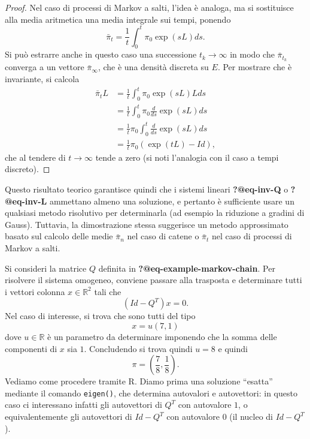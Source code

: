 \documentclass[
  italian,
  letterpaper,
]{book}
\newenvironment{Shaded}{\begin{snugshade}}{\end{snugshade}}
\newcommand{\AttributeTok}[1]{\textcolor[rgb]{0.40,0.45,0.13}{#1}}
\newcommand{\CommentTok}[1]{\textcolor[rgb]{0.37,0.37,0.37}{#1}}
\newcommand{\ConstantTok}[1]{\textcolor[rgb]{0.56,0.35,0.01}{#1}}
\newcommand{\DecValTok}[1]{\textcolor[rgb]{0.68,0.00,0.00}{#1}}
\newcommand{\FloatTok}[1]{\textcolor[rgb]{0.68,0.00,0.00}{#1}}
\newcommand{\FunctionTok}[1]{\textcolor[rgb]{0.28,0.35,0.67}{#1}}
\newcommand{\NormalTok}[1]{\textcolor[rgb]{0.00,0.23,0.31}{#1}}
\newcommand{\OtherTok}[1]{\textcolor[rgb]{0.00,0.23,0.31}{#1}}
\newcommand{\SpecialCharTok}[1]{\textcolor[rgb]{0.37,0.37,0.37}{#1}}
\newcommand{\bra}[1]{\left( #1 \right)}
\newcommand{\R}{\mathbb{R}}
\theoremstyle{definition}
\theoremstyle{remark}
\begin{document}
\begin{proof}
Nel caso di processi di Markov a salti, l'idea è analoga, ma si
sostituisce alla media aritmetica una media integrale sui tempi, ponendo
\[ \bar{\pi}_t = \frac 1 t \int_0^t \pi_0 \exp\bra{ s L} d s. \] Si può
estrarre anche in questo caso una successione \(t_k\to \infty\) in modo
che \(\bar{\pi}_{t_k}\) converga a un vettore \(\bar{\pi}_\infty\), che
è una densità discreta su \(E\). Per mostrare che è invariante, si
calcola
\[ \begin{split} \bar{\pi}_t L & = \frac 1 t \int_0^t \pi_0 \exp\bra{ s L} L  d s\\
& = \frac 1 t \int_0^t \pi_0 \frac{d}{ds} \exp\bra{ s L}   d s \\
& =  \frac 1 t  \pi_0 \int_0^t \frac{d}{ds} \exp\bra{ s L}   d s\\
& = \frac 1 t \pi_0 \bra{ \exp\bra{t L} - Id},\end{split}\] che al
tendere di \(t \to \infty\) tende a zero (si noti l'analogia con il caso
a tempi discreto).
\end{proof}

Questo risultato teorico garantisce quindi che i sistemi lineari
\textbf{?@eq-inv-Q} o \textbf{?@eq-inv-L} ammettano almeno una
soluzione, e pertanto è sufficiente usare un qualsiasi metodo risolutivo
per determinarla (ad esempio la riduzione a gradini di Gauss). Tuttavia,
la dimostrazione stessa suggerisce un metodo approssimato basato sul
calcolo delle medie \(\bar{\pi}_n\) nel caso di catene o
\(\bar{\pi}_{t}\) nel caso di processi di Markov a salti.

Si consideri la matrice \(Q\) definita in
\textbf{?@eq-example-markov-chain}. Per risolvere il sistema omogeneo,
conviene passare alla trasposta e determinare tutti i vettori colonna
\(x \in \R^2\) tali che \[ (Id - Q^T) x = 0.\] Nel caso di interesse, si
trova che sono tutti del tipo \[ x = u (7,1 )\] dove \(u \in \R\) è un
parametro da determinare imponendo che la somma delle componenti di
\(x\) sia \(1\). Concludendo si trova quindi \(u=8\) e quindi
\[ \pi = (\frac 7 8, \frac 1 8 ).\] Vediamo come procedere tramite R.
Diamo prima una soluzione ``esatta'' mediante il comando
\texttt{eigen()}, che determina autovalori e autovettori: in questo caso
ci interessano infatti gli autovettori di \(Q^T\) con autovalore \(1\),
o equivalentemente gli autovettori di \(Id - Q^T\) con autovalore \(0\)
(il nucleo di \(Id - Q^T\)).

\begin{Shaded}
\end{Shaded}
\end{document}
